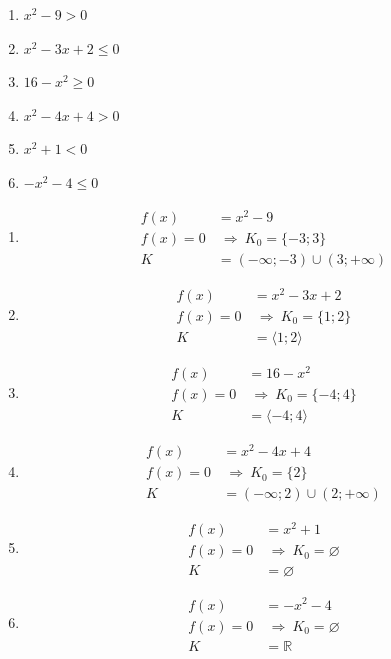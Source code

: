 \documentclass[11pt,a4paper]{article}
\begin{document}
\begin{zadaniReseniBox}[title={Domácí úkol}]
\begin{enumerate}[label=\alph*),itemsep=2pt]
\item $x^{2} - 9>0$
\item $x^{2} - 3x + 2\le0$
\item $16 - x^{2}\ge0$
\item $x^{2} - 4x + 4>0$
\item $x^{2} + 1<0$
\item $- x^{2} - 4\le0$
\end{enumerate}
\tcblower
\begin{enumerate}[label=\alph*),itemsep=2pt]
\item
\[\begin{aligned}
f(x)&=x^{2} - 9\\[2pt]
f(x)=0&\ \Rightarrow\ K_0=\{-3;3\}\\[2pt]
K&=(-\infty;-3)\cup(3;+\infty)
\end{aligned}\]
\item
\[\begin{aligned}
f(x)&=x^{2} - 3x + 2\\[2pt]
f(x)=0&\ \Rightarrow\ K_0=\{1;2\}\\[2pt]
K&=\langle1;2\rangle
\end{aligned}\]
\item
\[\begin{aligned}
f(x)&=16 - x^{2}\\[2pt]
f(x)=0&\ \Rightarrow\ K_0=\{-4;4\}\\[2pt]
K&=\langle-4;4\rangle
\end{aligned}\]
\item
\[\begin{aligned}
f(x)&=x^{2} - 4x + 4\\[2pt]
f(x)=0&\ \Rightarrow\ K_0=\{2\}\\[2pt]
K&=(-\infty;2)\cup(2;+\infty)
\end{aligned}\]
\item
\[\begin{aligned}
f(x)&=x^{2} + 1\\[2pt]
f(x)=0&\ \Rightarrow\ K_0=\varnothing\\[2pt]
K&=\varnothing
\end{aligned}\]
\item
\[\begin{aligned}
f(x)&=- x^{2} - 4\\[2pt]
f(x)=0&\ \Rightarrow\ K_0=\varnothing\\[2pt]
K&=\mathbb R
\end{aligned}\]
\end{enumerate}
\end{zadaniReseniBox}
\end{document}
